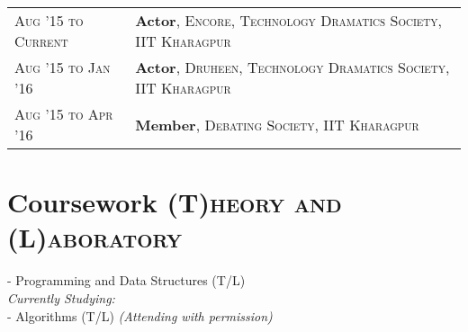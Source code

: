 \documentclass[a4paper,11pt]{extarticle} %
\begin{document}
\begin{tabular}{R{3.0cm}|p{15.0cm}}
\textsc{Aug '15 to Current} & \textbf{Actor}, \textsc{Encore, Technology Dramatics Society, IIT Kharagpur} \\
\textsc{Aug '15 to Jan '16} & \textbf{Actor}, \textsc{Druheen, Technology Dramatics Society, IIT Kharagpur} \\
\textsc{Aug '15 to Apr '16} & \textbf{Member}, \textsc{Debating Society, IIT Kharagpur} \\
\end{tabular}



\section{Coursework
\hfill\small\textsc{(T)heory and (L)aboratory}}

{\hspace{0.5cm}- Programming and Data Structures (T/L)}
\\
{\hspace*{0.5cm} \itshape{Currently Studying:}}
\\
{\hspace*{0.5cm}- Algorithms (T/L) \itshape{(Attending with permission)}}
\end{document}
